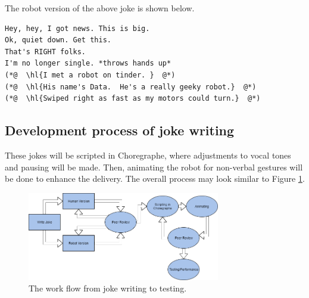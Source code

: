 \documentclass[onecolumn, draftclsnofoot,10pt, compsoc]{IEEEtran}
\begin{document}
The robot version of the above joke is shown below.

\begin{lstlisting}
Hey, hey, I got news. This is big.
Ok, quiet down. Get this.
That's RIGHT folks.
I'm no longer single. *throws hands up*
(*@  \hl{I met a robot on tinder. }  @*)
(*@  \hl{His name's Data.  He's a really geeky robot.}  @*)
(*@  \hl{Swiped right as fast as my motors could turn.}  @*)
\end{lstlisting}

\subsection{Development process of joke writing}
These jokes will be scripted in Choregraphe, where adjustments to vocal tones and pausing will be made.
Then, animating the robot for non-verbal gestures will be done to enhance the delivery.
The overall process may look similar to Figure \ref{fig:write_process}.

\begin{figure}[H]
  \centering
  \includegraphics[width=0.75\textwidth,height=0.75\textheight,keepaspectratio]{joke_writing_process}
  \caption{The work flow from joke writing to testing.}
	\label{fig:write_process}
\end{figure}




\pagebreak

\pagebreak
\clearpage
\end{document}
